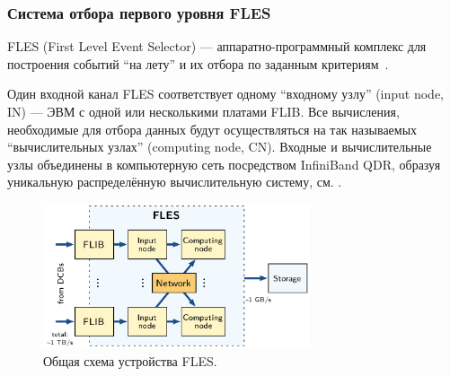 \subsubsection{Система отбора первого уровня FLES}\label{sec:secFLES}

\bigskip

FLES (First Level Event Selector) --- аппаратно-программный комплекс для построения событий ``на лету'' и их отбора по заданным критериям~\cite{FLES}.


Один входной канал FLES соответствует одному ``входному узлу'' (input node, IN) --- ЭВМ с одной или несколькими платами FLIB. Все вычисления, необходимые для отбора данных будут осуществляться на так называемых ``вычислительных узлах'' (computing node, CN). Входные и вычислительные узлы объединены в компьютерную сеть посредством InfiniBand QDR, образуя уникальную распределённую вычислительную систему, см. .

\begin{figure}[H]
\centering
\includegraphics[width=0.7\textwidth]{pictures/FLESarch.png}
\caption{Общая схема устройства FLES.}
\label{fig:FLESarch}
\end{figure}

